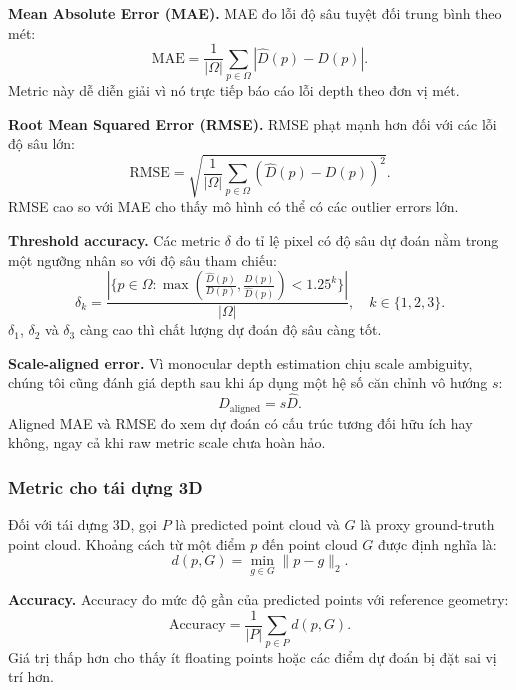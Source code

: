 \documentclass[12pt,a4paper]{article}
\begin{document}
\textbf{Mean Absolute Error (MAE).} MAE đo lỗi độ sâu tuyệt đối trung bình theo mét:
\begin{equation}
\mathrm{MAE}=\frac{1}{|\Omega|}\sum_{p\in\Omega}|\hat{D}(p)-D(p)|.
\end{equation}
Metric này dễ diễn giải vì nó trực tiếp báo cáo lỗi depth theo đơn vị mét.

\textbf{Root Mean Squared Error (RMSE).} RMSE phạt mạnh hơn đối với các lỗi độ sâu lớn:
\begin{equation}
\mathrm{RMSE}=\sqrt{\frac{1}{|\Omega|}\sum_{p\in\Omega}(\hat{D}(p)-D(p))^2}.
\end{equation}
RMSE cao so với MAE cho thấy mô hình có thể có các outlier errors lớn.

\textbf{Threshold accuracy.} Các metric $\delta$ đo tỉ lệ pixel có độ sâu dự đoán nằm trong một ngưỡng nhân so với độ sâu tham chiếu:
\begin{equation}
\delta_k = \frac{|\{p\in\Omega: \max(\frac{\hat{D}(p)}{D(p)},\frac{D(p)}{\hat{D}(p)}) < 1.25^k\}|}{|\Omega|}, \quad k\in\{1,2,3\}.
\end{equation}
$\delta_1$, $\delta_2$ và $\delta_3$ càng cao thì chất lượng dự đoán độ sâu càng tốt.

\textbf{Scale-aligned error.} Vì monocular depth estimation chịu scale ambiguity, chúng tôi cũng đánh giá depth sau khi áp dụng một hệ số căn chỉnh vô hướng $s$:
\begin{equation}
D_{\text{aligned}} = s\hat{D}.
\end{equation}
Aligned MAE và RMSE đo xem dự đoán có cấu trúc tương đối hữu ích hay không, ngay cả khi raw metric scale chưa hoàn hảo.

\subsubsection{Metric cho tái dựng 3D}
Đối với tái dựng 3D, gọi $P$ là predicted point cloud và $G$ là proxy ground-truth point cloud. Khoảng cách từ một điểm $p$ đến point cloud $G$ được định nghĩa là:
\begin{equation}
d(p,G)=\min_{g\in G}\|p-g\|_2.
\end{equation}

\textbf{Accuracy.} Accuracy đo mức độ gần của predicted points với reference geometry:
\begin{equation}
\mathrm{Accuracy}=\frac{1}{|P|}\sum_{p\in P}d(p,G).
\end{equation}
Giá trị thấp hơn cho thấy ít floating points hoặc các điểm dự đoán bị đặt sai vị trí hơn.
\end{document}
